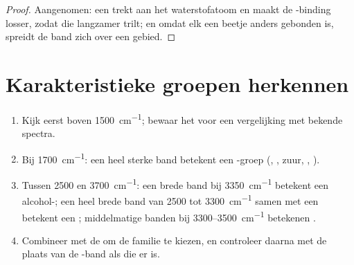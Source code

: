 \begin{proof}
Aangenomen: een  trekt aan het waterstofatoom en maakt de
-binding losser, zodat die langzamer trilt; en omdat elk 
een beetje anders gebonden is, spreidt de band zich over een gebied.
\end{proof}

\section{Karakteristieke groepen herkennen}


\begin{method}\label{met:g11:infrared:reading}
\begin{enumerate}
  \item Kijk eerst boven \qty{1500}{cm^{-1}}; bewaar het
         voor een vergelijking met bekende spectra.
  \item Bij \qty{1700}{cm^{-1}}: een heel sterke band betekent een
        -groep (, , zuur, , ).
  \item Tussen 2500 en \qty{3700}{cm^{-1}}: een brede band bij
        \qty{3350}{cm^{-1}} betekent een alcohol-; een heel brede
        band van 2500 tot \qty{3300}{cm^{-1}} samen met een 
        betekent een ; middelmatige banden bij
        3300--\qty{3500}{cm^{-1}} betekenen .
  \item Combineer met de  om de familie te kiezen, en
        controleer daarna met de plaats van de -band als die er
        is.
\end{enumerate}
\end{method}

